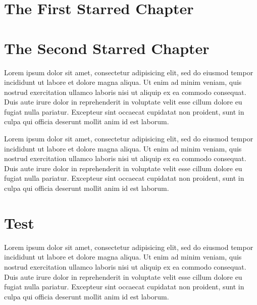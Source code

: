 \documentclass[10pt,a4paper,extrafontsizes,oldfontcommands,oneside]{memoir}
\begin{document}
\clearpage


\mainmatter

\chapter*{The First Starred Chapter} %
\label{chap:the_first_starred_chapter}


\chapter*{The Second Starred Chapter} %
\label{chap:the_second_starred_chapter}

Lorem ipsum dolor sit amet, consectetur adipisicing elit, sed do eiusmod tempor incididunt ut labore et dolore magna aliqua. Ut enim ad minim veniam, quis nostrud exercitation ullamco laboris nisi ut aliquip ex ea commodo consequat. Duis aute irure dolor in reprehenderit in voluptate velit esse cillum dolore eu fugiat nulla pariatur. Excepteur sint occaecat cupidatat non proident, sunt in culpa qui officia deserunt mollit anim id est laborum.

Lorem ipsum dolor sit amet, consectetur adipisicing elit, sed do eiusmod tempor incididunt ut labore et dolore magna aliqua. Ut enim ad minim veniam, quis nostrud exercitation ullamco laboris nisi ut aliquip ex ea commodo consequat. Duis aute irure dolor in reprehenderit in voluptate velit esse cillum dolore eu fugiat nulla pariatur. Excepteur sint occaecat cupidatat non proident, sunt in culpa qui officia deserunt mollit anim id est laborum.


\chapter[Test TOC][Test Header]{Test} %
\label{chap:test}

Lorem ipsum dolor sit amet, consectetur adipisicing elit, sed do eiusmod tempor incididunt ut labore et dolore magna aliqua. Ut enim ad minim veniam, quis nostrud exercitation ullamco laboris nisi ut aliquip ex ea commodo consequat. Duis aute irure dolor in reprehenderit in voluptate velit esse cillum dolore eu fugiat nulla pariatur. Excepteur sint occaecat cupidatat non proident, sunt in culpa qui officia deserunt mollit anim id est laborum.
\end{document}
